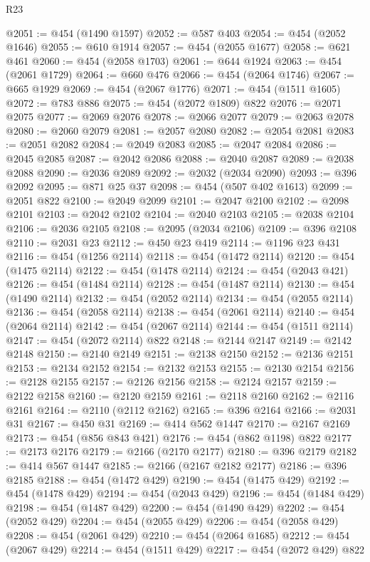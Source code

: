 \begin{lexlean}{R23}
\begin{coremodule}
@2051 := @454 (@1490 @1597)
@2052 := @587 @403
@2054 := @454 (@2052 @1646)
@2055 := @610 @1914
@2057 := @454 (@2055 @1677)
@2058 := @621 @461
@2060 := @454 (@2058 @1703)
@2061 := @644 @1924
@2063 := @454 (@2061 @1729)
@2064 := @660 @476
@2066 := @454 (@2064 @1746)
@2067 := @665 @1929
@2069 := @454 (@2067 @1776)
@2071 := @454 (@1511 @1605)
@2072 := @783 @886
@2075 := @454 (@2072 @1809) @822
@2076 := @2071 @2075
@2077 := @2069 @2076
@2078 := @2066 @2077
@2079 := @2063 @2078
@2080 := @2060 @2079
@2081 := @2057 @2080
@2082 := @2054 @2081
@2083 := @2051 @2082
@2084 := @2049 @2083
@2085 := @2047 @2084
@2086 := @2045 @2085
@2087 := @2042 @2086
@2088 := @2040 @2087
@2089 := @2038 @2088
@2090 := @2036 @2089
@2092 := @2032 (@2034 @2090)
@2093 := @396 @2092
@2095 := @871 @25 @37
@2098 := @454 (@507 @402 @1613)
@2099 := @2051 @822
@2100 := @2049 @2099
@2101 := @2047 @2100
@2102 := @2098 @2101
@2103 := @2042 @2102
@2104 := @2040 @2103
@2105 := @2038 @2104
@2106 := @2036 @2105
@2108 := @2095 (@2034 @2106)
@2109 := @396 @2108
@2110 := @2031 @23
@2112 := @450 @23 @419
@2114 := @1196 @23 @431
@2116 := @454 (@1256 @2114)
@2118 := @454 (@1472 @2114)
@2120 := @454 (@1475 @2114)
@2122 := @454 (@1478 @2114)
@2124 := @454 (@2043 @421)
@2126 := @454 (@1484 @2114)
@2128 := @454 (@1487 @2114)
@2130 := @454 (@1490 @2114)
@2132 := @454 (@2052 @2114)
@2134 := @454 (@2055 @2114)
@2136 := @454 (@2058 @2114)
@2138 := @454 (@2061 @2114)
@2140 := @454 (@2064 @2114)
@2142 := @454 (@2067 @2114)
@2144 := @454 (@1511 @2114)
@2147 := @454 (@2072 @2114) @822
@2148 := @2144 @2147
@2149 := @2142 @2148
@2150 := @2140 @2149
@2151 := @2138 @2150
@2152 := @2136 @2151
@2153 := @2134 @2152
@2154 := @2132 @2153
@2155 := @2130 @2154
@2156 := @2128 @2155
@2157 := @2126 @2156
@2158 := @2124 @2157
@2159 := @2122 @2158
@2160 := @2120 @2159
@2161 := @2118 @2160
@2162 := @2116 @2161
@2164 := @2110 (@2112 @2162)
@2165 := @396 @2164
@2166 := @2031 @31
@2167 := @450 @31
@2169 := @414 @562 @1447
@2170 := @2167 @2169
@2173 := @454 (@856 @843 @421)
@2176 := @454 (@862 @1198) @822
@2177 := @2173 @2176
@2179 := @2166 (@2170 @2177)
@2180 := @396 @2179
@2182 := @414 @567 @1447
@2185 := @2166 (@2167 @2182 @2177)
@2186 := @396 @2185
@2188 := @454 (@1472 @429)
@2190 := @454 (@1475 @429)
@2192 := @454 (@1478 @429)
@2194 := @454 (@2043 @429)
@2196 := @454 (@1484 @429)
@2198 := @454 (@1487 @429)
@2200 := @454 (@1490 @429)
@2202 := @454 (@2052 @429)
@2204 := @454 (@2055 @429)
@2206 := @454 (@2058 @429)
@2208 := @454 (@2061 @429)
@2210 := @454 (@2064 @1685)
@2212 := @454 (@2067 @429)
@2214 := @454 (@1511 @429)
@2217 := @454 (@2072 @429) @822

\end{coremodule}
\end{lexlean}
